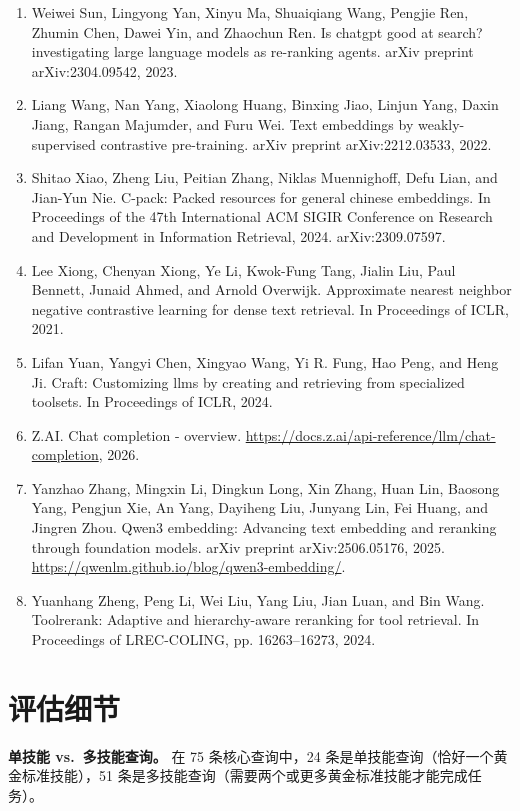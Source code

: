 \documentclass[11pt,UTF8,fontset=fandol]{ctexart}
\begin{document}
\begin{enumerate}[leftmargin=2em,itemsep=0.2em]
\item Weiwei Sun, Lingyong Yan, Xinyu Ma, Shuaiqiang Wang, Pengjie Ren, Zhumin Chen, Dawei Yin, and Zhaochun Ren. Is chatgpt good at search? investigating large language models as re-ranking agents. arXiv preprint arXiv:2304.09542, 2023.
\item Liang Wang, Nan Yang, Xiaolong Huang, Binxing Jiao, Linjun Yang, Daxin Jiang, Rangan Majumder, and Furu Wei. Text embeddings by weakly-supervised contrastive pre-training. arXiv preprint arXiv:2212.03533, 2022.
\item Shitao Xiao, Zheng Liu, Peitian Zhang, Niklas Muennighoff, Defu Lian, and Jian-Yun Nie. C-pack: Packed resources for general chinese embeddings. In Proceedings of the 47th International ACM SIGIR Conference on Research and Development in Information Retrieval, 2024. arXiv:2309.07597.
\item Lee Xiong, Chenyan Xiong, Ye Li, Kwok-Fung Tang, Jialin Liu, Paul Bennett, Junaid Ahmed, and Arnold Overwijk. Approximate nearest neighbor negative contrastive learning for dense text retrieval. In Proceedings of ICLR, 2021.
\item Lifan Yuan, Yangyi Chen, Xingyao Wang, Yi R. Fung, Hao Peng, and Heng Ji. Craft: Customizing llms by creating and retrieving from specialized toolsets. In Proceedings of ICLR, 2024.
\item Z.AI. Chat completion - overview. \url{https://docs.z.ai/api-reference/llm/chat-completion}, 2026.
\item Yanzhao Zhang, Mingxin Li, Dingkun Long, Xin Zhang, Huan Lin, Baosong Yang, Pengjun Xie, An Yang, Dayiheng Liu, Junyang Lin, Fei Huang, and Jingren Zhou. Qwen3 embedding: Advancing text embedding and reranking through foundation models. arXiv preprint arXiv:2506.05176, 2025. \url{https://qwenlm.github.io/blog/qwen3-embedding/}.
\item Yuanhang Zheng, Peng Li, Wei Liu, Yang Liu, Jian Luan, and Bin Wang. Toolrerank: Adaptive and hierarchy-aware reranking for tool retrieval. In Proceedings of LREC-COLING, pp. 16263--16273, 2024.
\end{enumerate}

\appendix

\section{评估细节}

\textbf{单技能 vs.\ 多技能查询。} 在 75 条核心查询中，24 条是单技能查询（恰好一个黄金标准技能），51 条是多技能查询（需要两个或更多黄金标准技能才能完成任务）。
\end{document}
